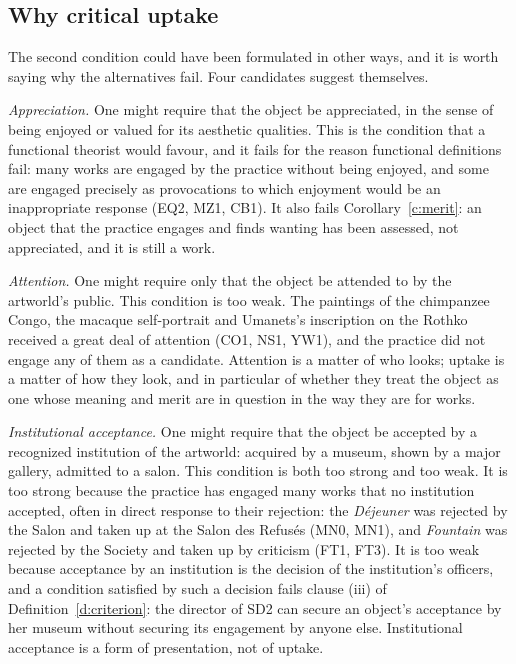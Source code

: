 \documentclass{situationist-preprint}
\begin{document}
\subsection{Why critical uptake}

The second condition could have been formulated in other ways, and it is worth saying why the alternatives fail. Four candidates suggest themselves.

\emph{Appreciation.} One might require that the object be appreciated, in the sense of being enjoyed or valued for its aesthetic qualities. This is the condition that a functional theorist would favour, and it fails for the reason functional definitions fail: many works are engaged by the practice without being enjoyed, and some are engaged precisely as provocations to which enjoyment would be an inappropriate response (EQ2, MZ1, CB1). It also fails Corollary~\ref{c:merit}: an object that the practice engages and finds wanting has been assessed, not appreciated, and it is still a work.

\emph{Attention.} One might require only that the object be attended to by the artworld's public. This condition is too weak. The paintings of the chimpanzee Congo, the macaque self-portrait and Umanets's inscription on the Rothko received a great deal of attention (CO1, NS1, YW1), and the practice did not engage any of them as a candidate. Attention is a matter of who looks; uptake is a matter of how they look, and in particular of whether they treat the object as one whose meaning and merit are in question in the way they are for works.

\emph{Institutional acceptance.} One might require that the object be accepted by a recognized institution of the artworld: acquired by a museum, shown by a major gallery, admitted to a salon. This condition is both too strong and too weak. It is too strong because the practice has engaged many works that no institution accepted, often in direct response to their rejection: the \emph{D\'ejeuner} was rejected by the Salon and taken up at the Salon des Refus\'es (MN0, MN1), and \emph{Fountain} was rejected by the Society and taken up by criticism (FT1, FT3). It is too weak because acceptance by an institution is the decision of the institution's officers, and a condition satisfied by such a decision fails clause (iii) of Definition~\ref{d:criterion}: the director of SD2 can secure an object's acceptance by her museum without securing its engagement by anyone else. Institutional acceptance is a form of presentation, not of uptake.
\end{document}
